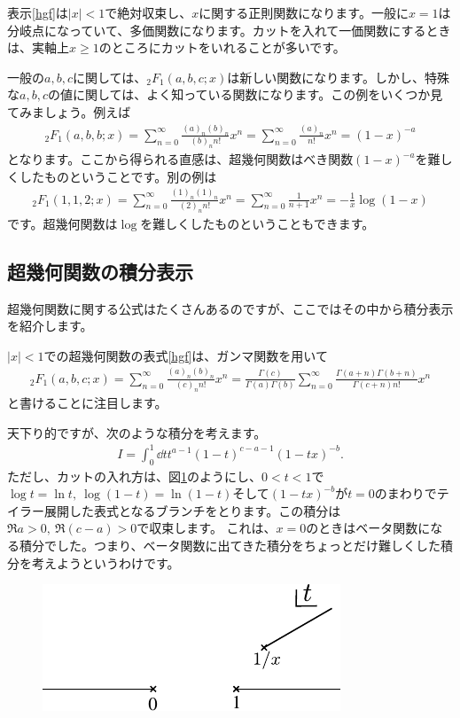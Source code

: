 \documentclass[report,paper=a4, fontsize=12pt, line_length=16cm, number_of_lines=33,dvipdfmx]{jlreq}
\numberwithin{equation}{section}
\newcommand{\HG}{{}_2F_1}
\begin{document}
表示\eqref{hgf}は$|x|<1$で絶対収束し、$x$に関する正則関数になります。一般に$x=1$は分岐点になっていて、多価関数になります。カットを入れて一価関数にするときは、実軸上$x\ge 1$のところにカットをいれることが多いです。

一般の$a,b,c$に関しては、$\HG(a,b,c;x)$は新しい関数になります。しかし、特殊な$a,b,c$の値に関しては、よく知っている関数になります。この例をいくつか見てみましょう。例えば
\begin{align}
  \HG(a,b,b;x)=\sum_{n=0}^{\infty}\frac{(a)_n(b)_n}{(b)_n n!}x^n=\sum_{n=0}^{\infty}\frac{(a)_n}{n!}x^n
  =(1-x)^{-a}
\end{align}
となります。ここから得られる直感は、超幾何関数はべき関数$(1-x)^{-a}$を難しくしたものということです。別の例は
\begin{align}
  \HG(1,1,2;x)=\sum_{n=0}^{\infty}\frac{(1)_n(1)_n}{(2)_n n!}x^n=\sum_{n=0}^{\infty}\frac{1}{n+1}x^n=-\frac{1}{x}\log(1-x)
\end{align}
です。超幾何関数は$\log$を難しくしたものということもできます。

\subsection{超幾何関数の積分表示}
超幾何関数に関する公式はたくさんあるのですが、ここではその中から積分表示を紹介します。

$|x|<1$での超幾何関数の表式\eqref{hgf}は、ガンマ関数を用いて
\begin{align}
  \HG(a,b,c;x)=\sum_{n=0}^{\infty}\frac{(a)_n(b)_n}{(c)_n n!} x^n
  =\frac{\Gamma(c)}{\Gamma(a)\Gamma(b)}
  \sum_{n=0}^{\infty}\frac{\Gamma(a+n)\Gamma(b+n)}{\Gamma(c+n)n!}x^n\label{temphggamma}
\end{align}
と書けることに注目します。

天下り的ですが、次のような積分を考えます。
\begin{align}
  I=\int_{0}^{1}\dd{t}t^{a-1}(1-t)^{c-a-1}(1-tx)^{-b}.
  \label{temphgintegral}
\end{align}
ただし、カットの入れ方は、図\ref{fig:hgcut}のようにし、$0<t<1$で$\log t=\ln t,\ \log(1-t)=\ln(1-t)$そして$(1-tx)^{-b}$が$t=0$のまわりでテイラー展開した表式となるブランチをとります。この積分は$\Re a>0,\ \Re(c-a)>0$で収束します。
これは、$x=0$のときはベータ関数になる積分でした。つまり、ベータ関数に出てきた積分をちょっとだけ難しくした積分を考えようというわけです。
\begin{figure}[htbp]
  \centering
  \includegraphics{hgcut.pdf}
  \caption{}
  \label{fig:hgcut}
\end{figure}
\end{document}
